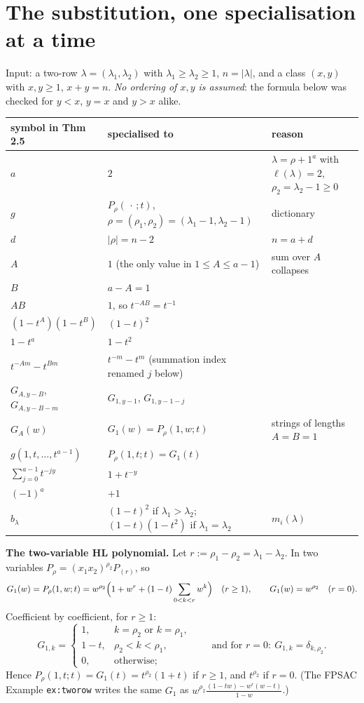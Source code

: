 \documentclass[10pt]{article}
\begin{document}
\section{The substitution, one specialisation at a time}
Input: a two-row $\lambda=(\lambda_1,\lambda_2)$ with $\lambda_1\ge\lambda_2\ge1$, $n=|\lambda|$, and a class $(x,y)$ with $x,y\ge1$, $x+y=n$.
\emph{No ordering of $x,y$ is assumed}: the formula below was checked for $y<x$, $y=x$ and $y>x$ alike.
\begin{center}\small
\begin{tabular}{@{}lll@{}}
\toprule
symbol in Thm 2.5 & specialised to & reason\\ \midrule
$a$ & $2$ & $\lambda=\rho+1^a$ with $\ell(\lambda)=2$, $\rho_2=\lambda_2-1\ge0$\\
$g$ & $P_\rho(\,\cdot\,;t)$, $\rho=(\rho_1,\rho_2)=(\lambda_1-1,\lambda_2-1)$ & dictionary\\
$d$ & $|\rho|=n-2$ & $n=a+d$\\
$A$ & $1$ (the only value in $1\le A\le a-1$) & sum over $A$ collapses\\
$B$ & $a-A=1$ & \\
$AB$ & $1$, so $t^{-AB}=t^{-1}$ & \\
$(1-t^A)(1-t^B)$ & $(1-t)^2$ & \\
$1-t^a$ & $1-t^2$ & \\
$t^{-Am}-t^{Bm}$ & $t^{-m}-t^{m}$ (summation index renamed $j$ below) & \\
$G_{A,y-B}$, $G_{A,y-B-m}$ & $G_{1,y-1}$, $G_{1,y-1-j}$ & \\
$G_A(w)$ & $G_1(w)=P_\rho(1,w;t)$ & strings of lengths $A=B=1$\\
$g(1,t,\dots,t^{a-1})$ & $P_\rho(1,t;t)=G_1(t)$ & \\
$\sum_{j=0}^{a-1}t^{-jy}$ & $1+t^{-y}$ & \\
$(-1)^a$ & $+1$ & \\
$b_\lambda$ & $(1-t)^2$ if $\lambda_1>\lambda_2$;\ $(1-t)(1-t^2)$ if $\lambda_1=\lambda_2$ & $m_i(\lambda)$\\
\bottomrule
\end{tabular}
\end{center}
\textbf{The two-variable HL polynomial.} Let $r:=\rho_1-\rho_2=\lambda_1-\lambda_2$. In two variables $P_\rho=(x_1x_2)^{\rho_2}P_{(r)}$, so
\[
G_1(w)=P_\rho(1,w;t)=w^{\rho_2}\Bigl(1+w^{r}+(1-t)\sum_{0<k<r}w^k\Bigr)\quad(r\ge1),\qquad G_1(w)=w^{\rho_2}\quad(r=0).
\]
Coefficient by coefficient, for $r\ge1$:
\[
G_{1,k}=\begin{cases}1,&k=\rho_2\text{ or }k=\rho_1,\\ 1-t,&\rho_2<k<\rho_1,\\ 0,&\text{otherwise};\end{cases}
\qquad\text{and for }r=0:\ G_{1,k}=\delta_{k,\rho_2}.
\]
Hence $P_\rho(1,t;t)=G_1(t)=t^{\rho_2}(1+t)$ if $r\ge1$, and $t^{\rho_2}$ if $r=0$.
(The FPSAC Example \texttt{ex:tworow} writes the same $G_1$ as $w^{\rho_2}\frac{(1-tw)-w^r(w-t)}{1-w}$.)
\end{document}
